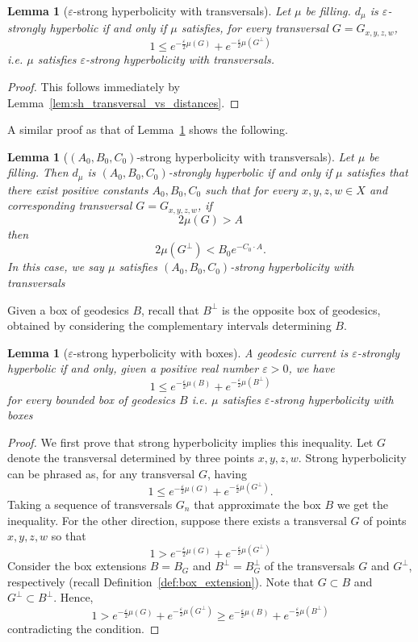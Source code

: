\documentclass[12pt]{amsart}
\numberwithin{equation}{section}
\numberwithin{figure}{section}
\newtheorem{lemma}[equation]{Lemma}
\theoremstyle{definition}
\theoremstyle{plain}
\renewcommand{\epsilon}{\varepsilon}
\begin{document}
\begin{lemma}[$\epsilon$-strong hyperbolicity with transversals]
Let $\mu$ be filling.
$d_{\mu}$ is $\epsilon$-strongly hyperbolic if and only if $\mu$ satisfies, for every transversal $G=G_{x,y,z,w}$,
\[
1 \leq e^{-\frac{\epsilon}{2} \mu(G)} + e^{-\frac{\epsilon}{2} \mu(G^{\perp})}
\]
i.e. $\mu$ satisfies \emph{$\epsilon$-strong hyperbolicity with transversals}.
\label{lem:eps_sh_trans}
\end{lemma}
\begin{proof} 
This follows immediately by Lemma~\ref{lem:sh_transversal_vs_distances}. \end{proof}

A similar proof as that of Lemma~\ref{lem:eps_sh_trans} shows the following.

\begin{lemma}[$(A_0,B_0,C_0)$-strong hyperbolicity with transversals]
Let $\mu$ be filling.
Then $d_{\mu}$ is $(A_0,B_0,C_0)$-strongly hyperbolic if and only if $\mu$ satisfies that there exist positive constants $A_0,B_0,C_0$ such that for every $x,y,z,w \in X$ and corresponding transversal $G=G_{x,y,z,w}$,
if
\[
2\mu(G) > A
\]
then
\[
2\mu(G^{\perp})< B_0 e^{-C_0 \cdot A}.
\] In this case, we say $\mu$ satisfies \emph{$(A_0,B_0,C_0)$-strong hyperbolicity with transversals}
\label{lem:sh_abc_trans}
\end{lemma}




Given a box of geodesics $B$, recall that $B^{\perp}$ is the opposite box of geodesics, obtained by considering the complementary intervals determining $B$.

\begin{lemma}[$\epsilon$-strong hyperbolicity with boxes]
A geodesic current is $\epsilon$-strongly hyperbolic if and only, given a positive real number $\epsilon>0$, we have
\[
1 \leq e^{-\frac{\epsilon}{2} \mu(B)} + e^{-\frac{\epsilon}{2} \mu(B^{\perp})}
\]
for every bounded box of geodesics $B$
i.e. $\mu$ satisfies \emph{$\epsilon$-strong hyperbolicity with boxes}
\label{lem:sh_boxes}
\end{lemma}
\begin{proof}
We first prove that strong hyperbolicity implies this inequality. 
Let $G$ denote the transversal determined by three points $x,y,z,w$.
Strong hyperbolicity can be phrased as, for any transversal $G$, having
\[
1 \leq e^{-\frac{\epsilon}{2} \mu(G)} + e^{-\frac{\epsilon}{2} \mu(G^{\perp})}.
\]
Taking a sequence of transversals $G_n$ that approximate the box $B$ we get the inequality.
For the other direction, suppose there exists a transversal $G$ of points $x,y,z,w$ so that
\[
1 > e^{-\frac{\epsilon}{2} \mu(G)} + e^{-\frac{\epsilon}{2} \mu(G^{\perp})}
\]
Consider the box extensions $B=B_G$ and $B^{\perp}=B_G^{\perp}$ of the transversals $G$ and $G^\perp$, respectively (recall Definition~\ref{def:box_extension}).
Note that $G \subset B$ and $G^{\perp} \subset B^{\perp}$. Hence, 
\[
1 > e^{-\frac{\epsilon}{2} \mu(G)} + e^{-\frac{\epsilon}{2} \mu(G^{\perp})} \geq e^{-\frac{\epsilon}{2} \mu(B)} + e^{-\frac{\epsilon}{2} \mu(B^{\perp})} 
\]
contradicting the condition.
\end{proof}
\end{document}
